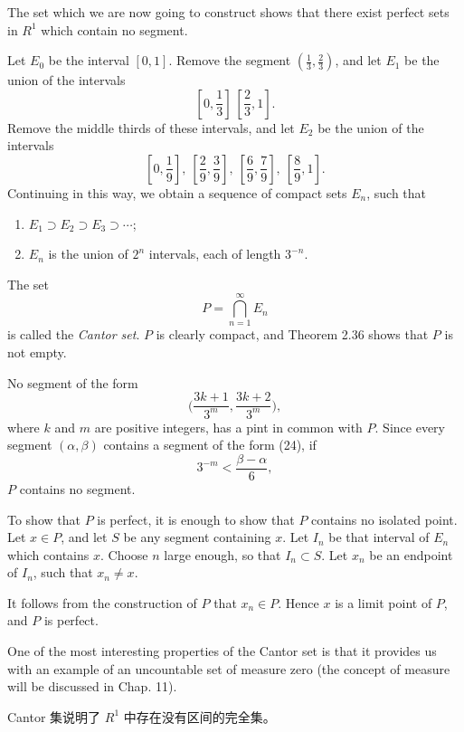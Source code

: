 \documentclass[../poma-notes.tex]{subfiles}
\begin{document}
\begin{namedtheorem}
  \normalfont
  The set which we are now going to construct shows that there exist perfect sets in $R^1$ which contain no segment.

  Let $E_0$ be the interval $[0,1]$. Remove the segment $(\frac{1}{3},\frac{2}{3})$, and let $E_1$ be the union of
  the intervals
  \[ [0,\frac{1}{3}]\ [\frac{2}{3},1]. \]
  Remove the middle thirds of these intervals, and let $E_2$ be the union of the intervals
  \[ [0,\frac{1}{9}],\ [\frac{2}{9},\frac{3}{9}],\ [\frac{6}{9},\frac{7}{9}],\ [\frac{8}{9},1]. \]
  Continuing in this way, we obtain a sequence of compact sets $E_n$, such that
  \begin{enumerate}[label=(\alph*)]
    \item $E_1 \supset E_2 \supset E_3 \supset \cdots$;
    \item $E_n$ is the union of $2^n$ intervals, each of length $3^{-n}$.
  \end{enumerate}

  The set
  \[ P = \bigcap\limits_{n=1}^{\infty} E_n \]
  is called the \textit{Cantor set}. $P$ is clearly compact, and Theorem 2.36 shows that $P$ is not empty.

  No segment of the form
  \begin{equation}
    \Biggl( \frac{3k+1}{3^m}, \frac{3k+2}{3^m} \Biggr),
  \end{equation}
  where $k$ and $m$ are positive integers, has a pint in common with $P$. Since every segment $(\alpha, \beta)$
  contains a segment of the form (24), if
  \[ 3^{-m} < \frac{\beta - \alpha}{6}, \]
  $P$ contains no segment.

  To show that $P$ is perfect, it is enough to show that $P$ contains no isolated point. Let $x \in P$, and let $S$
  be any segment containing $x$. Let $I_n$ be that interval of $E_n$ which contains $x$. Choose $n$ large enough,
  so that $I_n \subset S$. Let $x_n$ be an endpoint of $I_n$, such that $x_n \ne x$.

  It follows from the construction of $P$ that $x_n \in P$. Hence $x$ is a limit point of $P$, and $P$ is perfect.

  One of the most interesting properties of the Cantor set is that it provides us with an example of an uncountable
  set of measure zero (the concept of measure will be discussed in Chap. 11).
\end{namedtheorem}

\anote Cantor 集说明了 $R^1$ 中存在没有区间的完全集。
\end{document}
